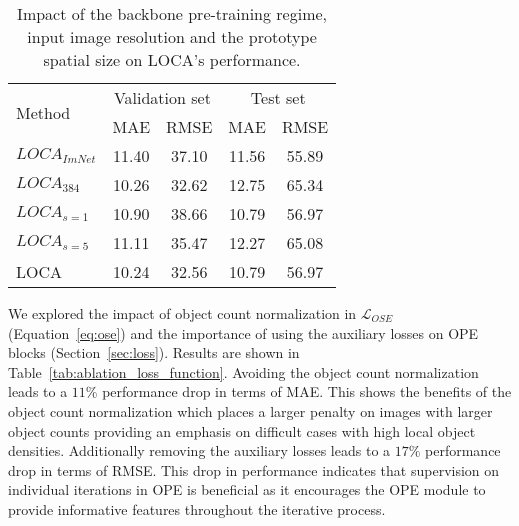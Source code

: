 \documentclass[10pt,twocolumn,letterpaper]{article}
\begin{document}
\begin{table}[htbp]
    \centering
    \begin{tabular}{l c c c c}
        \toprule
        \multirow{2}{*}{Method}& \multicolumn{2}{c}{Validation set} & \multicolumn{2}{c}{Test set} \\
        & MAE & RMSE & MAE & RMSE \\ 
        \midrule
        $LOCA_{ImNet}$         & 11.40 & 37.10 & 11.56 & 55.89 \\
        $LOCA_{384}$           & 10.26 & 32.62 & 12.75 & 65.34 \\
        $LOCA_{s=1}$           & 10.90 & 38.66 & 10.79 & 56.97 \\
        $LOCA_{s=5}$           & 11.11 & 35.47 & 12.27 & 65.08 \\
        LOCA                   & 10.24 & 32.56 & 10.79 & 56.97 \\
        \bottomrule
    \end{tabular}
    \caption{Impact of the backbone pre-training regime, input image resolution and the prototype spatial size on LOCA's performance.}
    \label{tab:other}
\end{table}






















 We explored the impact of object count normalization in $\mathcal{L}_{OSE}$ (Equation~\ref{eq:ose}) and the importance of using the auxiliary losses on OPE blocks (Section~\ref{sec:loss}). Results are shown in Table~\ref{tab:ablation_loss_function}. Avoiding the object count normalization leads to a $11\%$ performance drop in terms of MAE. This shows the benefits of the object count normalization which places a larger penalty on images with larger object counts providing an emphasis on difficult cases with high local object densities.
Additionally removing the auxiliary losses leads to a $17\%$ performance drop in terms of RMSE. This drop in performance indicates that supervision on individual iterations in OPE is beneficial as it encourages the OPE module to provide informative features throughout the iterative process.
\end{document}

